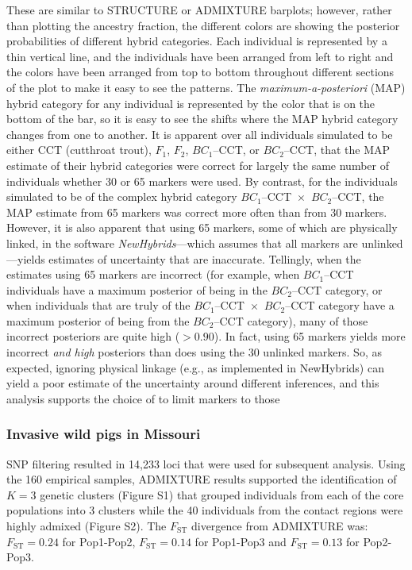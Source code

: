 {\begin{figure}
\begin{center}
\end{center}
\caption[\nhbpcap]{\sometimes{\nhbpcap}}
\label{fig:newhyb-sims-barplot}
\end{figure}
These are similar to STRUCTURE or ADMIXTURE barplots;
however, rather than plotting the ancestry fraction, the different colors are showing the
posterior probabilities of different hybrid categories.  Each individual is represented by a thin
vertical line, and the individuals have been arranged from left to right and the colors have been
arranged from top to bottom throughout different sections of the plot to make it easy to see
the patterns.  The {\em maximum-a-posteriori} (MAP) hybrid category for any individual is represented
by the color that is on the bottom of the bar, so it is easy to see the shifts where the MAP hybrid
category changes from one to another.  It is apparent over all individuals simulated to be
either CCT (cutthroat trout), $F_1$, $F_2$, $BC_1$--CCT, or $BC_2$--CCT, that the MAP estimate of their
hybrid categories were correct for largely the same number of individuals whether 30 or 65 markers
were used. By contrast, for the individuals simulated to be of the complex hybrid category
$BC_1$--CCT~$\times$~$BC_2$--CCT, the MAP estimate from 65 markers was correct more often 
than from 
30 markers.  However, it is also apparent that using 65 markers, some of which are physically
linked, in the software {\em NewHybrids}---which assumes that all markers are unlinked---yields 
estimates of uncertainty that are inaccurate.  Tellingly, when the estimates using 65 markers are 
incorrect (for example, when $BC_1$--CCT individuals have a maximum posterior of being in the 
$BC_2$--CCT category,
or when individuals that are truly of the $BC_1$--CCT~$\times$~$BC_2$--CCT category have a
maximum posterior of being from the $BC_2$--CCT category), many of those incorrect posteriors
are quite high ($>0.90$).  In fact, using 65 markers yields more incorrect {\em and high} posteriors 
than does using the 30 unlinked markers. So, as expected, ignoring physical linkage (e.g., as 
implemented in {\sc NewHybrids}) 
can yield a poor estimate of the uncertainty around different inferences, and this analysis
supports the choice of \citet{rizza2023limited} to limit markers to those 

\subsubsection*{Invasive wild pigs in Missouri}

SNP filtering resulted in 14,233 loci that were used for subsequent analysis.
Using the 160 empirical samples, ADMIXTURE results supported the identification of
$K=3$ genetic clusters (Figure S1) that grouped individuals from each of the core populations into 3 clusters
while the 40 individuals from the contact regions were highly admixed (Figure S2). The
$F_\mathrm{ST}$ divergence from ADMIXTURE was:
$F_\mathrm{ST} = 0.24$ for Pop1-Pop2,
$F_\mathrm{ST} = 0.14$ for Pop1-Pop3 and
$F_\mathrm{ST} = 0.13$ for Pop2-Pop3.

}
